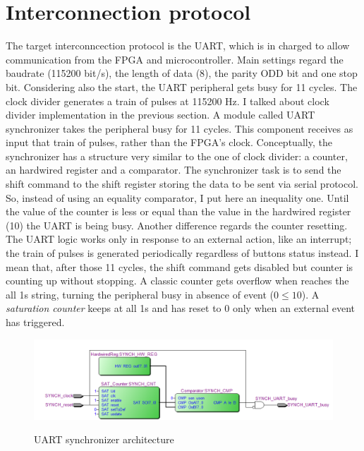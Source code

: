 \section{Interconnection protocol}
The target interconncection protocol is the UART, which is in charged to allow communication from the FPGA and microcontroller. Main settings regard the baudrate (115200 bit/s), the length of data (8), the parity ODD bit and one stop bit. Considering also the start, the UART peripheral gets busy for 11 cycles.
\newline
\newline
The clock divider generates a train of pulses at 115200 Hz. I talked about clock divider implementation in the previous section. A module called UART synchronizer takes the peripheral busy for 11 cycles. This component receives as input that train of pulses, rather than the FPGA's clock. Conceptually, the synchronizer has a structure very similar to the one of clock divider: a counter, an hardwired register and a comparator. The synchronizer task is to send the shift command to the shift register storing the data to be sent via serial protocol. So, instead of using an equality comparator, I put here an inequality one. Until the value of the counter is less or equal than the value in the hardwired register (10) the UART is being busy. Another difference regards the counter resetting. The UART logic works only in response to an external action, like an interrupt; the train of pulses is generated periodically regardless of buttons status instead. I mean that, after those 11 cycles, the shift command gets disabled but counter is counting up without stopping. A classic counter gets overflow when reaches the all 1s string, turning the peripheral busy in absence of event ($0 \leq 10$). A \textit{saturation counter} keeps at all 1s and has reset to 0 only when an external event has triggered.

\begin{figure}[H]
\centering
\includegraphics[scale=.8]{Immagini/20}
\label{20}
\caption{UART synchronizer architecture}
\end{figure}
